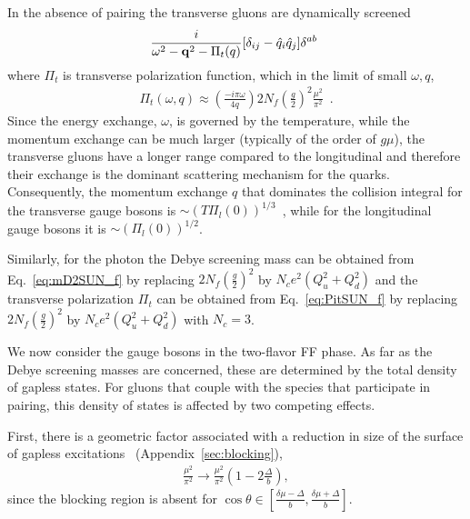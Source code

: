 \documentclass[10pt, aps, prd, superscriptaddress, nofootinbib, 
               amsmath, amssymb, twocolumn,
               preprintnumbers, showpacs,
               raggedbottom,
               floatfix]{revtex4-1}
\newcommand{\bfq}{{\bf{q}}}
\begin{document}
In the absence of pairing the transverse gluons are dynamically screened
\begin{equation}
\begin{split}
\frac{i}{\omega^2-\bfq^2-\Pi_t(q)}[\delta_{ij}-\hat{q}_i\hat{q}_j]\delta^{ab}~\label{eq:propT}
\end{split}
\end{equation}
where $\Pi_t$ is transverse polarization function, which in the limit of small
$\omega, q$,
\begin{equation}
\begin{split}
\Pi_t(\omega, q) \approx (\frac{-i\pi\omega}{4q}) 2N_f (\frac{g}{2})^2
\frac{\mu^2}{\pi^2}~\label{eq:PitSUN_f}\;.
\end{split}
\end{equation}
Since the energy exchange, $\omega$, is governed by the temperature, while the
momentum exchange can be much larger (typically of the order of $g\mu$), the
transverse gluons have a longer range compared to the
longitudinal and therefore their exchange is the dominant 
scattering mechanism for the quarks. Consequently, the momentum exchange $q$
that dominates the collision integral for the transverse gauge bosons is $\sim
(T \Pi_l(0))^{1/3}$~\cite{Baym:1990}, while for the longitudinal gauge bosons it is $\sim
(\Pi_l(0))^{1/2}$. 

Similarly, for the photon the Debye screening mass can be obtained from
Eq.~\ref{eq:mD2SUN_f} by replacing $2N_f(\frac{g}{2})^2$ by $N_c
e^2(Q_u^2+Q_d^2)$ and the transverse polarization $\Pi_t$ can be obtained from
Eq.~\ref{eq:PitSUN_f} by replacing $2N_f(\frac{g}{2})^2$ by $N_c
e^2(Q_u^2+Q_d^2)$ with $N_c=3$. 

We now consider the gauge bosons in the two-flavor FF phase. As far as the Debye
screening masses are concerned, these are determined by the total density of
gapless states. For gluons that couple with the species that participate in
pairing, this density of states is affected by two competing effects.

First, there is a geometric factor associated with a reduction in size of the
surface of gapless excitations~\cite{Alford:2000ze} 
(Appendix~\ref{sec:blocking}), 
\begin{equation}
\begin{split}
\frac{\mu^2}{\pi^2}\rightarrow \frac{\mu^2}{\pi^2}(1-2\frac{\Delta}{b}),
\end{split}
\end{equation}
since the blocking region is absent for 
$\cos\theta\in[\frac{\delta\mu-\Delta}{b},\frac{\delta\mu+\Delta}{b}]$.
\end{document}

